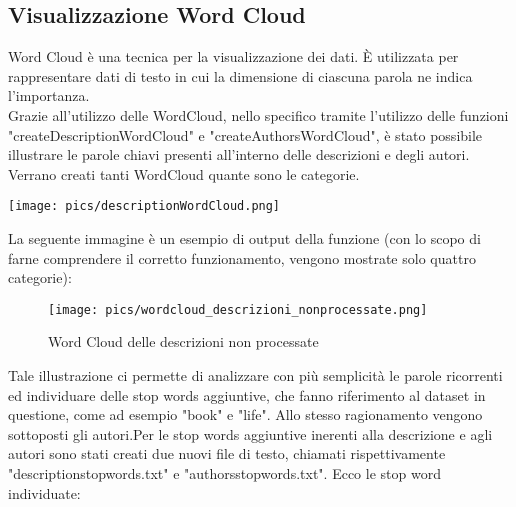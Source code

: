 \documentclass[12pt,oneside]{article}
\begin{document}
    \hfill
    \hfill
    \begin{enumerate}
    \subsection{Visualizzazione Word Cloud}
    \begin{justify}
    Word Cloud è una tecnica per la visualizzazione dei dati. È utilizzata per rappresentare dati di testo in cui la dimensione di ciascuna parola ne indica l'importanza.\\
    Grazie all'utilizzo delle WordCloud, nello specifico tramite l'utilizzo delle funzioni "createDescriptionWordCloud" e "createAuthorsWordCloud", è stato possibile illustrare le parole chiavi presenti all'interno delle descrizioni e degli autori. Verrano creati tanti WordCloud quante sono le categorie.
    \end{justify}
    \texttt{[image: pics/descriptionWordCloud.png]}
    
    \newpage
    \begin{justify}
    La seguente immagine è un esempio di output della funzione (con lo scopo di farne comprendere il corretto funzionamento, vengono mostrate solo quattro categorie):
    \end{justify}
    \begin{figure}[H]
    \centering
    \texttt{[image: pics/wordcloud\_descrizioni\_nonprocessate.png]}
    \caption{Word Cloud delle descrizioni non processate}
    \end{figure}

    \begin{justify}
    Tale illustrazione ci permette di analizzare con più semplicità le parole ricorrenti ed individuare delle stop words aggiuntive, che fanno riferimento al dataset in questione, come ad esempio "book" e "life". Allo stesso ragionamento vengono sottoposti gli autori.Per le stop words aggiuntive inerenti alla descrizione e agli autori sono stati creati due nuovi file di testo, chiamati rispettivamente "description\textunderscore{}stopwords.txt" e "authors\textunderscore{}stopwords.txt". Ecco le stop word individuate:
    \end{justify}
    

\end{enumerate}
\end{document}
